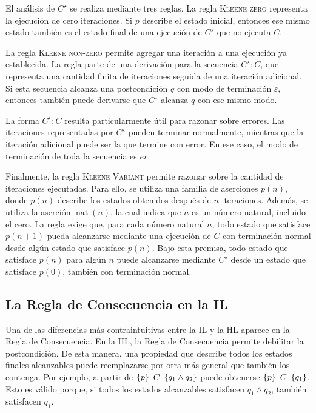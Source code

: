 \documentclass[a4paper,	11pt]{report}
\begin{document}
El análisis de $C^\star$ se realiza mediante tres reglas.
La regla \textsc{Kleene zero} representa la ejecución de cero iteraciones.
Si $p$ describe el estado inicial,
entonces ese mismo estado también es el estado final de una ejecución de $C^\star$ que no ejecuta $C$.

La regla \textsc{Kleene non-zero} permite agregar una iteración a una ejecución ya establecida.
La regla parte de una derivación para la secuencia $C^\star; C$,
que representa una cantidad finita de iteraciones seguida de una iteración adicional.
Si esta secuencia alcanza una postcondición $q$ con modo de terminación $\varepsilon$,
entonces también puede derivarse que $C^\star$ alcanza $q$ con ese mismo modo.

La forma $C^\star; C$ resulta particularmente útil para razonar sobre errores.
Las iteraciones representadas por $C^\star$ pueden terminar normalmente,
mientras que la iteración adicional puede ser la que termine con error.
En ese caso, el modo de terminación de toda la secuencia es $er$.

Finalmente, la regla \textsc{Kleene Variant} permite razonar sobre la cantidad de iteraciones ejecutadas.
Para ello, se utiliza una familia de aserciones $p(n)$,
donde $p(n)$ describe los estados obtenidos después de $n$ iteraciones.
Además,
se utiliza la aserción $\operatorname{nat}(n)$,
la cual indica que $n$ es un número natural,
incluido el cero.
La regla exige que,
para cada número natural $n$,
todo estado que satisface $p(n + 1)$ pueda alcanzarse mediante una ejecución de $C$ con terminación normal desde algún estado que satisface $p(n)$.
Bajo esta premisa,
todo estado que satisface $p(n)$ para algún $n$ puede alcanzarse mediante $C^\star$ desde un estado que satisface $p(0)$,
también con terminación normal.

\subsection*{La Regla de Consecuencia en la IL}
Una de las diferencias más contraintuitivas entre la IL y la HL aparece en la Regla de Consecuencia.
En la HL, la Regla de Consecuencia permite debilitar la postcondición.
De esta manera, una propiedad que describe todos los estados finales alcanzables
puede reemplazarse por otra más general que también los contenga.
Por ejemplo, a partir de
$\left\{ p \right\}~C~\left\{ q_1 \land q_2 \right\}$ puede obtenerse $\left\{ p \right\}~C~\left\{ q_1 \right\}$.
Esto es válido porque, si todos los estados alcanzables satisfacen $q_1 \land q_2$, también satisfacen $q_1$.
\end{document}
